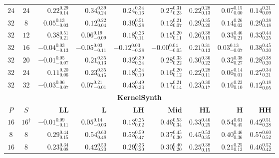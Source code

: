 \begin{table}[!tbp]
\begin{tabular}{@{}ccrrrrrrr@{}}
        $24$ & $24$ & $0.22_{0.14}^{0.29}$ & $0.34_{0.24}^{0.39}$ & $0.24_{0.16}^{0.34}$ & $0.27_{0.23}^{0.31}$ & $0.22_{0.13}^{0.28}$ & $0.07_{0.00}^{0.15}$ & $0.14_{0.09}^{0.21}$ \\
        \addlinespace[2pt]
        $32$ & $8$ & $0.05_{-0.03}^{0.13}$ & $0.12_{0.04}^{0.22}$ & $0.39_{0.28}^{0.51}$ & $0.12_{0.07}^{0.21}$ & $0.29_{0.20}^{0.35}$ & $0.14_{0.02}^{0.26}$ & $0.29_{0.18}^{0.38}$ \\
        $32$ & $12$ & $0.38_{0.21}^{0.51}$ & $0.06_{-0.09}^{0.19}$ & $0.18_{0.11}^{0.26}$ & $0.15_{0.11}^{0.20}$ & $0.26_{0.15}^{0.38}$ & $0.33_{0.21}^{0.46}$ & $0.33_{0.25}^{0.44}$ \\
        $32$ & $16$ & $-0.04_{-0.13}^{0.03}$ & $-0.05_{-0.11}^{0.03}$ & $-0.12_{-0.28}^{0.03}$ & $-0.00_{-0.05}^{0.04}$ & $0.21_{0.13}^{0.31}$ & $0.03_{-0.07}^{0.13}$ & $0.38_{0.30}^{0.45}$ \\
        $32$ & $20$ & $-0.01_{-0.07}^{0.05}$ & $0.21_{0.13}^{0.35}$ & $0.32_{0.24}^{0.39}$ & $0.28_{0.22}^{0.33}$ & $0.30_{0.22}^{0.36}$ & $0.32_{0.27}^{0.38}$ & $0.28_{0.20}^{0.38}$ \\
        $32$ & $24$ & $0.11_{0.06}^{0.20}$ & $0.23_{0.15}^{0.35}$ & $0.18_{0.10}^{0.24}$ & $0.16_{0.12}^{0.20}$ & $0.22_{0.11}^{0.28}$ & $0.06_{0.01}^{0.14}$ & $0.27_{0.21}^{0.34}$ \\
        $32$ & $32$ & $-0.03_{-0.07}^{0.06}$ & $0.07_{-0.01}^{0.21}$ & $0.43_{0.33}^{0.49}$ & $0.17_{0.14}^{0.21}$ & $0.23_{0.17}^{0.30}$ & $0.16_{0.10}^{0.23}$ & $0.12_{0.05}^{0.18}$ \\
        \midrule
        \multicolumn{9}{c}{\textbf{KernelSynth}} \\
        \midrule
        \textbf{$P$} & \textbf{$S$} & \textbf{LL} & \textbf{L} & \textbf{LH} & \textbf{Mid} & \textbf{HL} & \textbf{H} & \textbf{HH} \\
        \midrule
        $16$ & $16^{\dagger}$ & $-0.01_{-0.11}^{0.09}$ & $0.05_{-0.03}^{0.14}$ & $0.13_{0.02}^{0.25}$ & $0.46_{0.34}^{0.53}$ & $0.33_{0.25}^{0.46}$ & $0.54_{0.45}^{0.61}$ & $0.42_{0.28}^{0.51}$ \\
        \midrule
        \addlinespace[2pt]
        $8$ & $8$ & $0.29_{0.15}^{0.44}$ & $0.54_{0.48}^{0.60}$ & $0.53_{0.47}^{0.59}$ & $0.37_{0.30}^{0.45}$ & $0.45_{0.35}^{0.53}$ & $0.40_{0.36}^{0.46}$ & $0.57_{0.52}^{0.60}$ \\
        \addlinespace[2pt]
        $16$ & $8$ & $0.23_{0.08}^{0.34}$ & $0.42_{0.20}^{0.50}$ & $0.29_{0.20}^{0.36}$ & $0.30_{0.20}^{0.40}$ & $0.25_{0.15}^{0.38}$ & $0.21_{0.13}^{0.25}$ & $0.46_{0.42}^{0.52}$ \\

\end{tabular}
\end{table}
